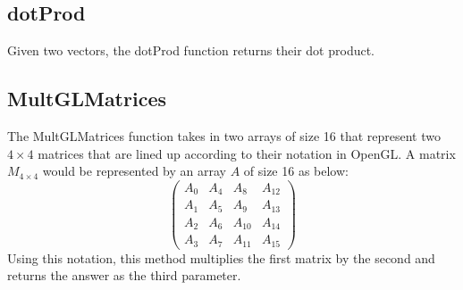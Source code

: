 \documentclass[a4paper]{article}
\begin{document}
\subsection{dotProd}
Given two vectors, the dotProd function returns their dot product.
\subsection{MultGLMatrices}
The MultGLMatrices function takes in two arrays of size 16 that represent two $4 \times 4$ matrices that are lined up according to their notation in OpenGL. A  matrix $M_{4 \times 4}$ would be represented by an array $A$ of size 16 as below:
\[ \left( \begin{array}{cccc}
A_0 & A_4	& A_8 & A_{12} \\
A_1 & A_5	& A_9 & A_{13} \\
A_2 & A_6	& A_{10} & A_{14} \\
A_3 & A_7	& A_{11} & A_{15}  \end{array} \right)\]
Using this notation, this method multiplies the first matrix by the second and returns the answer as the third parameter.
\end{document}
